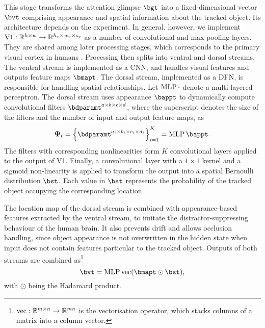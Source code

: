 \begin{description}[leftmargin=\parindent]
    This stage transforms the attention glimpse $\bgt$ into a fixed-dimensional vector $\bvt$ comprising appearance and spatial information about the tracked object. Its architecture depends on the experiment. In general, however, we implement $\mathrm{V1} : \mathbb{R}^{h \times w} \to \mathbb{R}^{h_v \times w_v \times c_v}$ as a number of convolutional and max-pooling layers. They are shared among later processing stages, which corresponds to the primary visual cortex in humans \cite{Dayan2001}. Processing then splits into ventral and dorsal streams. The ventral stream is implemented as a CNN, and handles visual features and outputs feature maps $\bmapt$. The dorsal stream, implemented as a DFN, is responsible for handling spatial relationships. Let $\operatorname{MLP}{\cdot}$ denote a multi-layered perceptron. The dorsal stream uses appearance $\bappt$ to dynamically compute convolutional filters $\bdparamt^{a \times b \times c \times d}$, where the superscript denotes the size of the filters and the number of input and output feature maps, as
 	\begin{equation}
 	    \B{\Psi}_t = \set{\bdparamt^{a_i \times b_i \times c_i \times d_i}}_{i=1}^{K} = \MLP{\bappt}.
 	\end{equation}
    The filters with corresponding nonlinearities form $K$ convolutional layers applied to the output of V1. Finally, a convolutional layer with a $1 \times 1$ kernel and a sigmoid non-linearity is applied to transform the output into a spatial Bernoulli distribution $\bst$. Each value in $\bst$ represents the probability of the tracked object occupying the corresponding location.
 
    The location map of the dorsal stream is combined with appearance-based features extracted by the ventral stream, to imitate the distractor-suppressing behaviour of the human brain. It also prevents drift  and allows occlusion handling, since object appearance is not overwritten in the hidden state when input does not contain features particular to the tracked object. Outputs of both streams are combined as\footnote{$\mathrm{vec}: \mathbb{R}^{m \times n} \to \mathbb{R}^{mn}$ is the vectorisation operator, which stacks columns of a matrix into a column vector.}
	\begin{equation}
		\bvt = \MLP{ \flatten{\bmapt \odot \bst}},
	\end{equation}
	with $\odot$ being the Hadamard product.
   
   
  \item[State Estimation]
    

\end{description}
